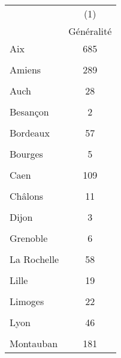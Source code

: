 {
\def\sym#1{\ifmmode^{#1}\else\(^{#1}\)\fi}
\begin{tabular}{l*{1}{c}}
\hline\hline
            &\multicolumn{1}{c}{(1)}\\
            &\multicolumn{1}{c}{Généralité}\\
\hline
Aix         &         685         \\
            &                     \\
[1em]
Amiens      &         289         \\
            &                     \\
[1em]
Auch        &          28         \\
            &                     \\
[1em]
Besançon    &           2         \\
            &                     \\
[1em]
Bordeaux    &          57         \\
            &                     \\
[1em]
Bourges     &           5         \\
            &                     \\
[1em]
Caen        &         109         \\
            &                     \\
[1em]
Châlons     &          11         \\
            &                     \\
[1em]
Dijon       &           3         \\
            &                     \\
[1em]
Grenoble    &           6         \\
            &                     \\
[1em]
La Rochelle &          58         \\
            &                     \\
[1em]
Lille       &          19         \\
            &                     \\
[1em]
Limoges     &          22         \\
            &                     \\
[1em]
Lyon        &          46         \\
            &                     \\
[1em]
Montauban   &         181         \\

\end{tabular}}
